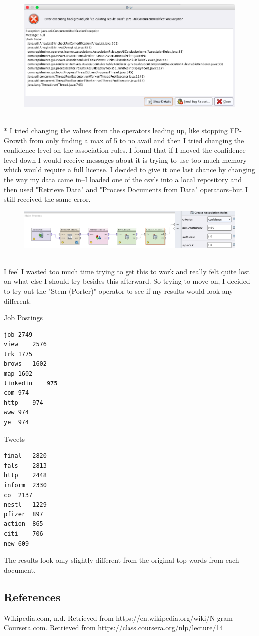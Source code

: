 \documentclass[10pt]{article}
\begin{document}
\begin{figure}[!h]
\includegraphics[scale=0.33]{java_exception.png}
\centering
\end{figure}
\\*
I tried changing the values from the operators leading up, like stopping FP-Growth from only finding a max of 5 to no avail and then I tried changing the confidence level on the association rules. I found that if I moved the confidence level down I would receive messages about it is trying to use too much memory which would require a full license. I decided to give it one last chance by changing the way my data came in--I loaded one of the csv's into a local repository and then used "Retrieve Data" and "Process Documents from Data" operators--but I still received the same error.
\begin{figure}[!h]
\includegraphics[scale=0.37]{altFail.png}
\centering
\end{figure}\\
I feel I wasted too much time trying to get this to work and really felt quite lost on what else I should try besides this afterward. So trying to move on, I decided to try out the "Stem (Porter)" operator to see if my results would look any different:
\begin{multicols}{2}
Job Postings
\begin{verbatim}
job	2749
view	2576
trk	1775
brows	1602
map	1602
linkedin	975
com	974
http	974
www	974
ye	974
\end{verbatim}
Tweets
\begin{verbatim}
final	2820
fals	2813
http	2448
inform	2330
co	2137
nestl	1229
pfizer	897
action	865
citi	706
new	609
\end{verbatim}
\end{multicols}
The results look only slightly different from the original top words from each document. 


\subsection*{References}
Wikipedia.com, n.d. Retrieved from https://en.wikipedia.org/wiki/N-gram\\
Coursera.com. Retrieved from https://class.coursera.org/nlp/lecture/14
\end{document}
